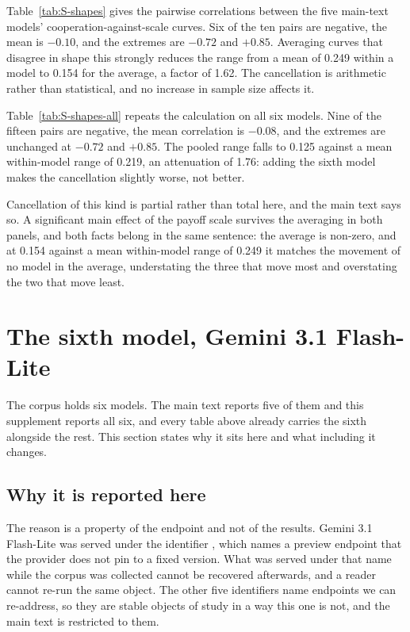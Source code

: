 \documentclass[11pt,a4paper]{article}
\begin{document}
Table~\ref{tab:S-shapes} gives the pairwise correlations between the five
main-text models' cooperation-against-scale curves. Six of the ten pairs are
negative, the mean is $-0.10$, and the extremes are $-0.72$ and $+0.85$.
Averaging curves that disagree in shape this strongly reduces the range from a
mean of 0.249 within a model to 0.154 for the average, a factor of 1.62. The
cancellation is arithmetic rather than statistical, and no increase in sample
size affects it.

Table~\ref{tab:S-shapes-all} repeats the calculation on all six models. Nine of
the fifteen pairs are negative, the mean correlation is $-0.08$, and the
extremes are unchanged at $-0.72$ and $+0.85$. The pooled range falls to 0.125
against a mean within-model range of 0.219, an attenuation of 1.76: adding the
sixth model makes the cancellation slightly worse, not better.

Cancellation of this kind is partial rather than total here, and the main text
says so. A significant main effect of the payoff scale survives the averaging
in both panels, and both facts belong in the same sentence: the average is
non-zero, and at 0.154 against a mean within-model range of 0.249 it matches the
movement of no model in the average, understating the three that move most and
overstating the two that move least.

\section{The sixth model, Gemini 3.1 Flash-Lite}

The corpus holds six models. The main text reports five of them and this
supplement reports all six, and every table above already carries the sixth
alongside the rest. This section states why it sits here and what including it
changes.

\subsection{Why it is reported here}

The reason is a property of the endpoint and not of the results. Gemini 3.1
Flash-Lite was served under the identifier
, which names a preview endpoint that the
provider does not pin to a fixed version. What was served under that name while
the corpus was collected cannot be recovered afterwards, and a reader cannot
re-run the same object. The other five identifiers name endpoints we can
re-address, so they are stable objects of study in a way this one is not, and
the main text is restricted to them.
\end{document}
